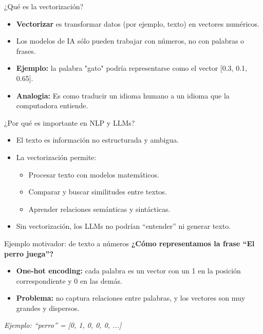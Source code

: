 \documentclass[aspectratio=169,xcolor=dvipsnames, t]{beamer}
\begin{document}
\begin{frame}{¿Qué es la vectorización?}
    \begin{itemize}
        \item \textbf{Vectorizar} es transformar datos (por ejemplo, texto) en vectores numéricos.
        \item Los modelos de IA sólo pueden trabajar con números, no con palabras o frases.
        \item \textbf{Ejemplo:} la palabra "gato" podría representarse como el vector [0.3, 0.1, 0.65].
        \item \textbf{Analogia:} Es como traducir un idioma humano a un idioma que la computadora entiende.
    \end{itemize}
    
\end{frame}

\begin{frame}{¿Por qué es importante en NLP y LLMs?}
    \begin{itemize}
        \item El texto es información no estructurada y ambigua.
        \item La vectorización permite:
        \begin{itemize}
            \item Procesar texto con modelos matemáticos.
            \item Comparar y buscar similitudes entre textos.
            \item Aprender relaciones semánticas y sintácticas.
        \end{itemize}
        \item Sin vectorización, los LLMs no podrían ``entender'' ni generar texto.
    \end{itemize}
    \vspace{0.3cm}
    
\end{frame}

\begin{frame}{Ejemplo motivador: de texto a números}
    \textbf{¿Cómo representamos la frase ``El perro juega''?}
    \begin{itemize}
        \item \textbf{One-hot encoding:} cada palabra es un vector con un 1 en la posición correspondiente y 0 en las demás.
        \item \textbf{Problema:} no captura relaciones entre palabras, y los vectores son muy grandes y dispersos.
    \end{itemize}
    \vspace{0.3cm}
    
    \vspace{0.2cm}
    \textit{Ejemplo: ``perro'' = [0, 1, 0, 0, 0, ...]}
\end{frame}
\end{document}

